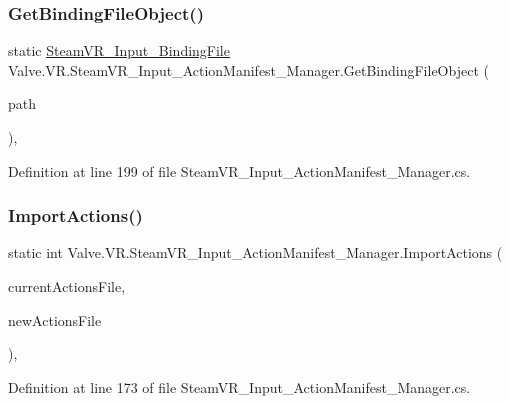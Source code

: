 \subsubsection{\texorpdfstring{GetBindingFileObject()}{GetBindingFileObject()}}
{\footnotesize\ttfamily static \mbox{\hyperlink{class_valve_1_1_v_r_1_1_steam_v_r___input___binding_file}{Steam\+V\+R\+\_\+\+Input\+\_\+\+Binding\+File}} Valve.\+V\+R.\+Steam\+V\+R\+\_\+\+Input\+\_\+\+Action\+Manifest\+\_\+\+Manager.\+Get\+Binding\+File\+Object (\begin{DoxyParamCaption}\item[{string}]{path }\end{DoxyParamCaption})\hspace{0.3cm}{\ttfamily [static]}, {\ttfamily [protected]}}



Definition at line 199 of file Steam\+V\+R\+\_\+\+Input\+\_\+\+Action\+Manifest\+\_\+\+Manager.\+cs.

\mbox{\label{class_valve_1_1_v_r_1_1_steam_v_r___input___action_manifest___manager_af0f4c904c4fb8cd0d233a30c9b1b04fc}} 
\subsubsection{\texorpdfstring{ImportActions()}{ImportActions()}}
{\footnotesize\ttfamily static int Valve.\+V\+R.\+Steam\+V\+R\+\_\+\+Input\+\_\+\+Action\+Manifest\+\_\+\+Manager.\+Import\+Actions (\begin{DoxyParamCaption}\item[{\mbox{\hyperlink{class_valve_1_1_v_r_1_1_steam_v_r___input___action_file}{Steam\+V\+R\+\_\+\+Input\+\_\+\+Action\+File}}}]{current\+Actions\+File,  }\item[{\mbox{\hyperlink{class_valve_1_1_v_r_1_1_steam_v_r___input___action_file}{Steam\+V\+R\+\_\+\+Input\+\_\+\+Action\+File}}}]{new\+Actions\+File }\end{DoxyParamCaption})\hspace{0.3cm}{\ttfamily [static]}, {\ttfamily [protected]}}



Definition at line 173 of file Steam\+V\+R\+\_\+\+Input\+\_\+\+Action\+Manifest\+\_\+\+Manager.\+cs.

